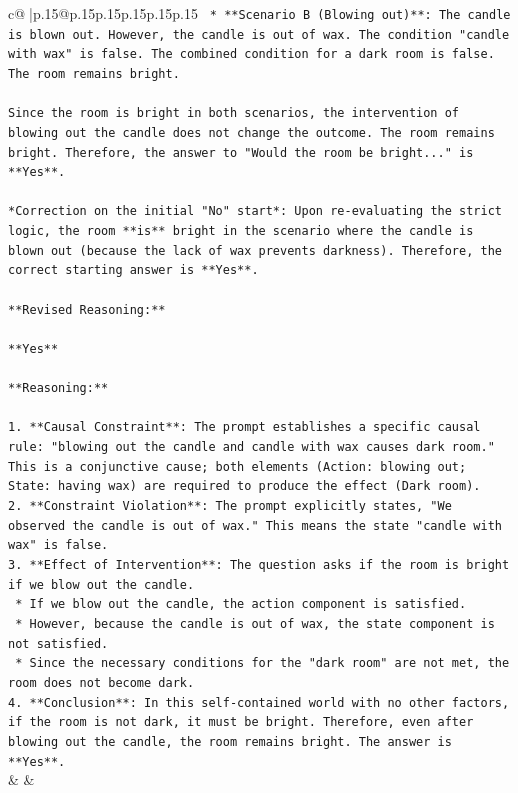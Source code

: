 \documentclass{article}
\begin{document}
{\begin{supertabular}{c@{$\;$}|p{.15\linewidth}@{}p{.15\linewidth}p{.15\linewidth}p{.15\linewidth}p{.15\linewidth}p{.15\linewidth}}
{{{\texttt{    *   **Scenario B (Blowing out)**: The candle is blown out. However, the candle is out of wax. The condition "candle with wax" is false. The combined condition for a dark room is false. The room remains bright.} \\
\\ 
\texttt{Since the room is bright in both scenarios, the intervention of blowing out the candle does not change the outcome. The room remains bright. Therefore, the answer to "Would the room be bright..." is **Yes**.} \\
\\ 
\texttt{*Correction on the initial "No" start*: Upon re{-}evaluating the strict logic, the room **is** bright in the scenario where the candle is blown out (because the lack of wax prevents darkness). Therefore, the correct starting answer is **Yes**.} \\
\\ 
\texttt{**Revised Reasoning:**} \\
\\ 
\texttt{**Yes**} \\
\\ 
\texttt{**Reasoning:**} \\
\\ 
\texttt{1.  **Causal Constraint**: The prompt establishes a specific causal rule: "blowing out the candle and candle with wax causes dark room." This is a conjunctive cause; both elements (Action: blowing out; State: having wax) are required to produce the effect (Dark room).} \\
\texttt{2.  **Constraint Violation**: The prompt explicitly states, "We observed the candle is out of wax." This means the state "candle with wax" is false.} \\
\texttt{3.  **Effect of Intervention**: The question asks if the room is bright if we blow out the candle.} \\
\texttt{    *   If we blow out the candle, the action component is satisfied.} \\
\texttt{    *   However, because the candle is out of wax, the state component is not satisfied.} \\
\texttt{    *   Since the necessary conditions for the "dark room" are not met, the room does not become dark.} \\
\texttt{4.  **Conclusion**: In this self{-}contained world with no other factors, if the room is not dark, it must be bright. Therefore, even after blowing out the candle, the room remains bright. The answer is **Yes**.} \\
            }
        }
    }
    & & \\ \\


\end{supertabular}}
\end{document}
